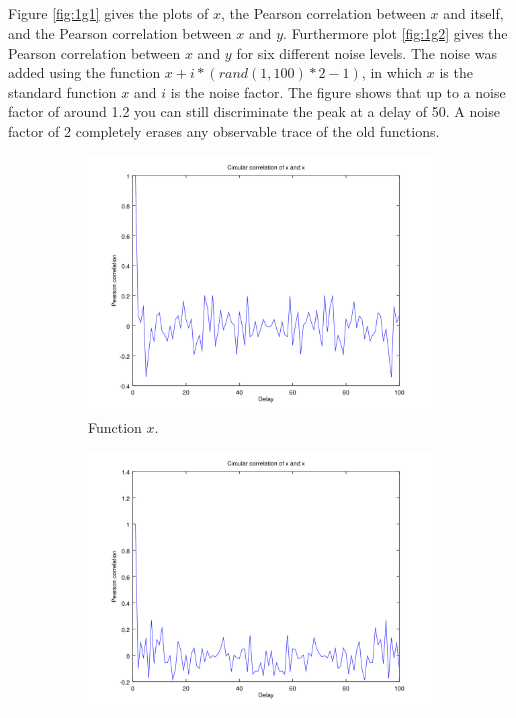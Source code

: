 \documentclass{article}
\begin{document}
\subsection{}
Figure \ref{fig:1g1} gives the plots of $x$, the Pearson correlation between $x$ and itself, and the Pearson correlation between $x$ and $y$. Furthermore plot \ref{fig:1g2} gives the Pearson correlation between $x$ and $y$ for six different noise levels. The noise was added using the function $x+i*(rand(1,100)*2-1)$, in which $x$ is the standard function $x$ and $i$ is the noise factor. The figure shows that up to a noise factor of around 1.2 you can still discriminate the peak at a delay of 50. A noise factor of 2 completely erases any observable trace of the old functions.
\begin{figure}[H]
	\centering
	\begin{subfigure}{0.49\textwidth}
		\centering
		\includegraphics[width=\textwidth]{plot1ga.png}
		\caption{Function $x$.}
	\end{subfigure}
	\begin{subfigure}{0.49\textwidth}
		\centering
		\includegraphics[width=\textwidth]{plot1gb.png}

\end{subfigure}
\end{figure}
\end{document}
